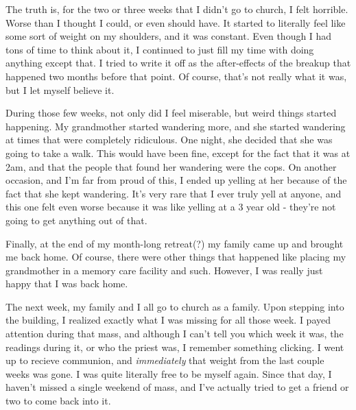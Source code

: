 \documentclass[12pt]{article}
\begin{document}
    The truth is, for the two or three weeks that I didn't go to church, I felt horrible. Worse than I thought I could, or even should
    have. It started to literally feel like some sort of weight on my shoulders, and it was constant. Even though I
    had tons of time to think about it, I continued to just fill my time with doing anything except that. I tried to
    write it off as the after-effects of the breakup that happened two months before that point. Of course, that's
    not really what it was, but I let myself believe it.
    
    During those few weeks, not only did I feel miserable, but weird things started happening. My grandmother started
    wandering more, and she started wandering at times that were completely ridiculous. One night, she decided that
    she was going to take a walk. This would have been fine, except for the fact that it was at 2am, and that the
    people that found her wandering were the cops. On another occasion, and I'm far from proud of this, I ended up
    yelling at her because of the fact that she kept wandering. It's very rare that I ever truly yell at anyone,
    and this one felt even worse because it was like yelling at a 3 year old - they're not going to get anything out
    of that.

    Finally, at the end of my month-long retreat(?) my family came up and brought me back home. Of course, there were
    other things that happened like placing my grandmother in a memory care facility and such. However, I was really 
    just happy that I was back home.

    The next week, my family and I all go to church as a family. Upon stepping into the building, I realized exactly
    what I was missing for all those week. I payed attention during that mass, and although I can't tell you which week
    it was, the readings during it, or who the priest was, I remember something clicking. I went up to recieve communion,
    and \textit{immediately} that weight from the last couple weeks was gone. I was quite literally free to be myself
    again. Since that day, I haven't missed a single weekend of mass, and I've actually tried to get a friend or two
    to come back into it.
\end{document}
